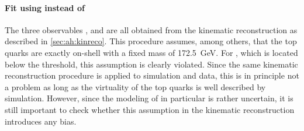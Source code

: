 \paragraph{Fit using \mbbll instead of \mtt}
The three observables \mtt, \chel and \chan are all obtained from the kinematic reconstruction as described in \cref{sec:ah:kinreco}. This procedure assumes, among others, that the top quarks are exactly on-shell with a fixed mass of \SI{172.5}{\GeV}. For \etat, which is located below the \ttbar threshold, this assumption is clearly violated. Since the same kinematic reconstruction procedure is applied to simulation and data, this is in principle not a problem as long as the virtuality of the top quarks is well described by simulation. However, since the modeling of \etat in particular is rather uncertain, it is still important to check whether this assumption in the kinematic reconstruction introduces any bias.

